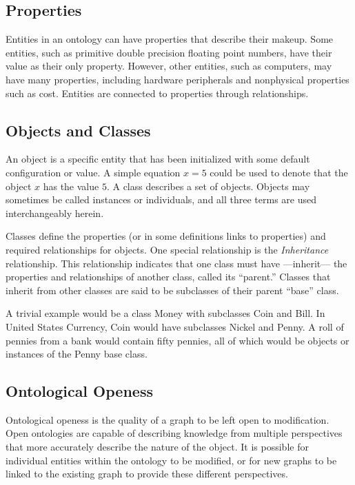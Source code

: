 \subsection{Properties}

Entities in an ontology can have properties that describe their makeup. Some
entities, such as primitive double precision floating point numbers, have their
value as their only property. However, other entities, such as computers, may
have many properties, including hardware peripherals and nonphysical properties
such as cost. Entities are connected to properties through relationships.

\subsection{Objects and Classes}

An object is a specific entity that has been initialized with some default
configuration or value. A simple equation $x = 5$ could be used to denote that
the object $x$ has the value $5$. A class describes a set of objects. Objects
may sometimes be called instances or individuals, and all three terms are used
interchangeably herein.

Classes define the properties (or in some definitions links to properties) and
required relationships for objects. One special relationship is the
\textit{Inheritance} relationship. This relationship indicates that one class
must have ---inherit--- the properties and relationships of another class,
called its ``parent.'' Classes that inherit from other classes are said to be
subclasses of their parent ``base'' class.

A trivial example would be a class Money with subclasses Coin and Bill. In
United States Currency, Coin would have subclasses Nickel and Penny. A roll of
pennies from a bank would contain fifty pennies, all of which would be objects
or instances of the Penny base class.

\subsection{Ontological Openess}
\label{ont-openess}

Ontological openess is the quality of a graph to be left open to modification.
Open ontologies are capable of describing knowledge from multiple perspectives
that more accurately describe the nature of the object. It is possible for
individual entities within the ontology to be modified, or for new graphs to be
linked to the existing graph to provide these different perspectives.

